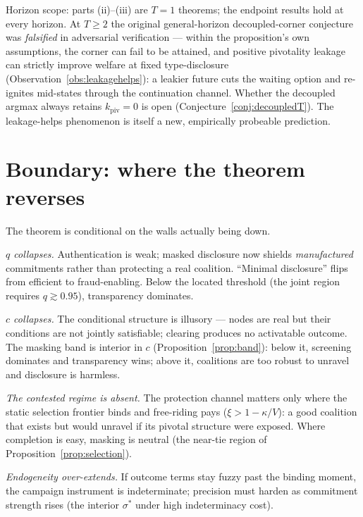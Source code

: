 \documentclass[11pt]{article}
\theoremstyle{definition}
\theoremstyle{remark}
\newcommand{\kpiv}{k_{\mathrm{piv}}}
\begin{document}
Horizon scope: parts (ii)--(iii) are $T=1$ theorems; the endpoint results hold at
every horizon. At $T\ge2$ the original general-horizon decoupled-corner conjecture was
\emph{falsified} in adversarial verification --- within the proposition's own assumptions,
the corner can fail to be attained, and positive pivotality leakage can strictly improve
welfare at fixed type-disclosure (Observation~\ref{obs:leakagehelps}): a leakier future
cuts the waiting option and re-ignites mid-states through the continuation channel.
Whether the decoupled argmax always retains $\kpiv=0$ is open
(Conjecture~\ref{conj:decoupledT}). The leakage-helps phenomenon is itself a new,
empirically probeable prediction.

\section{Boundary: where the theorem reverses}\label{sec:boundary}

The theorem is conditional on the walls actually being down.

\emph{$q$ collapses.} Authentication is weak; masked disclosure now shields
\emph{manufactured} commitments rather than protecting a real coalition. ``Minimal
disclosure'' flips from efficient to fraud-enabling. Below the located threshold
(the joint region requires $q\gtrsim0.95$), transparency dominates.

\emph{$c$ collapses.} The conditional structure is illusory --- nodes are real but their
conditions are not jointly satisfiable; clearing produces no activatable outcome. The
masking band is interior in $c$ (Proposition~\ref{prop:band}): below it, screening
dominates and transparency wins; above it, coalitions are too robust to unravel and
disclosure is harmless.

\emph{The contested regime is absent.} The protection channel matters only where the
static selection frontier binds and free-riding pays ($\xi > 1-\kappa/V$): a good
coalition that exists but would unravel if its pivotal structure were exposed. Where
completion is easy, masking is neutral (the near-tie region of
Proposition~\ref{prop:selection}).

\emph{Endogeneity over-extends.} If outcome terms stay fuzzy past the binding moment, the
campaign instrument is indeterminate; precision must harden as commitment strength rises
(the interior $\sigma^*$ under high indeterminacy cost).
\end{document}
